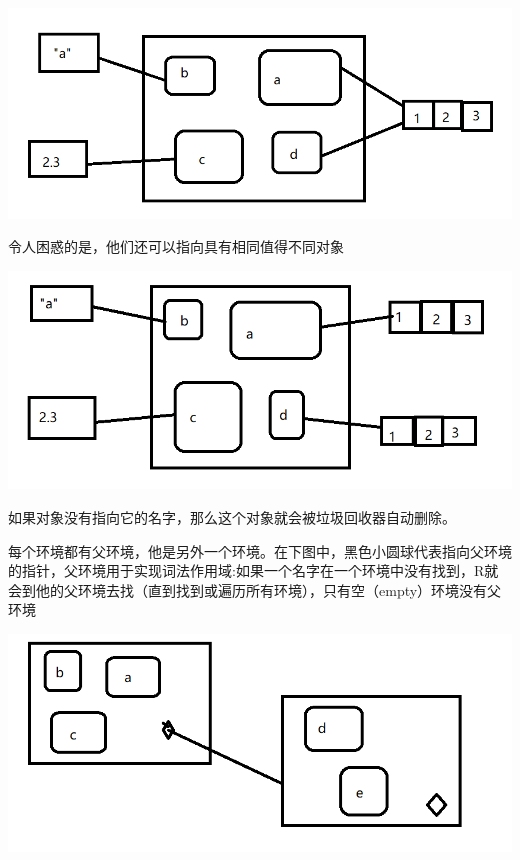 \documentclass[]{book}
\newenvironment{Shaded}{\begin{snugshade}}{\end{snugshade}}
\newcommand{\DecValTok}[1]{\textcolor[rgb]{0.00,0.00,0.81}{#1}}
\newcommand{\StringTok}[1]{\textcolor[rgb]{0.31,0.60,0.02}{#1}}
\newcommand{\OperatorTok}[1]{\textcolor[rgb]{0.81,0.36,0.00}{\textbf{#1}}}
\newcommand{\NormalTok}[1]{#1}
\begin{document}
\begin{center}\includegraphics{img/ch7-3} \end{center}

令人困惑的是，他们还可以指向具有相同值得不同对象

\begin{Shaded}
\end{Shaded}

\begin{center}\includegraphics{img/ch7-4} \end{center}

如果对象没有指向它的名字，那么这个对象就会被垃圾回收器自动删除。

每个环境都有父环境，他是另外一个环境。在下图中，黑色小圆球代表指向父环境的指针，父环境用于实现词法作用域:如果一个名字在一个环境中没有找到，R就会到他的父环境去找（直到找到或遍历所有环境），只有空（empty）环境没有父环境

\begin{center}\includegraphics{img/ch7-5} \end{center}
\end{document}
